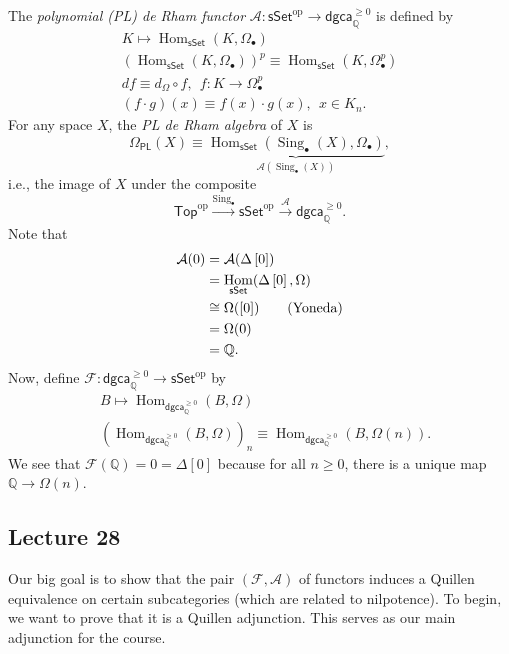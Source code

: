 \documentclass[10pt,letterpaper,cm]{nupset}
\theoremstyle{definition}
\theoremstyle{theorem}
\theoremstyle{remark}
\newcommand{\A}{\mathcal A}
\newcommand{\PL}{\mathsf{PL}}
\newcommand{\F}{\mathcal F}
\newcommand{\Q}{\mathbb Q}
\newcommand{\1}{\mathbb{1}}
\newcommand{\dgca}{\mathsf{dgca}}
\newcommand{\0}{\vec 0}
\DeclareMathOperator{\Hom}{Hom}
\DeclareMathOperator{\op}{op}
\DeclareMathOperator{\sing}{Sing}
\begin{document}
The \textit{polynomial (PL) de Rham functor} $\A : \mathsf{sSet}^{\op} \to \dgca_{\Q}^{\geq 0}$ is defined by
\begin{gather*}
K   \mapsto \Hom_{\mathsf{sSet}}(K, \Omega_{\bullet})  
\\ \left(\Hom_{\mathsf{sSet}}(K, \Omega_{\bullet})\right)^p  \equiv \Hom_{\mathsf{sSet}}(K, \Omega_{\bullet}^p)
\\ d{f}   \equiv d_{\Omega} \circ f, \ \ f : K \to \Omega_{\bullet}^p
\\ \left(f \cdot g\right)(x)   \equiv f(x) \cdot g(x), \ \ x \in K_n
.\end{gather*}
For any space $X$, the \textit{PL de Rham algebra} of $X$ is 
\[
 \Omega_{\PL}(X)  \equiv   \underbrace{\Hom_{\mathsf{sSet}}(\sing_{\bullet}(X), \Omega_{\bullet})}_{\A(\sing_{\bullet}(X))},
\]
i.e., the image of $X$ under the composite
\[
\mathsf{Top}^{\op} \xrightarrow{\sing_{\bullet}} \mathsf{sSet}^{\op} \xrightarrow{\A} \dgca_{\Q}^{\geq 0}.
\]
Note that 
\begin{align*}
\A(0) & = \A(\Delta\left[0\right]) 
\\ & = \Hom_{\mathsf{sSet}}(\Delta\left[0\right], \Omega)
\\ & \cong \Omega(\left[0\right]) \tag{\text{Yoneda}}
\\ & = \Omega(0)
\\ & = \Q.
\end{align*}
Now, define $\F: \dgca_{\Q}^{\geq 0} \to \mathsf{sSet}^{\op}$ by 
\begin{align*}
& B  \mapsto \Hom_{\dgca_{\Q}^{\geq 0}}(B, \Omega)
\\ &  \left(\Hom_{\dgca_{\Q}^{\geq 0}}(B, \Omega)\right)_n  \equiv  \Hom_{\dgca_{\Q}^{\geq 0}}(B, \Omega(n)).
\end{align*} We see that $\F(\Q) = 0 = \Delta\left[0\right]$ because for all $n \geq 0$, there is a unique map $\Q \to \Omega(n)$.



\subsection{Lecture 28}

Our big goal is to show that the pair $\left(\F, \A\right)$ of functors induces a Quillen equivalence on certain subcategories (which are related to nilpotence). To begin, we want to prove that it is a Quillen adjunction. This serves as our main adjunction for the course.
\end{document}
